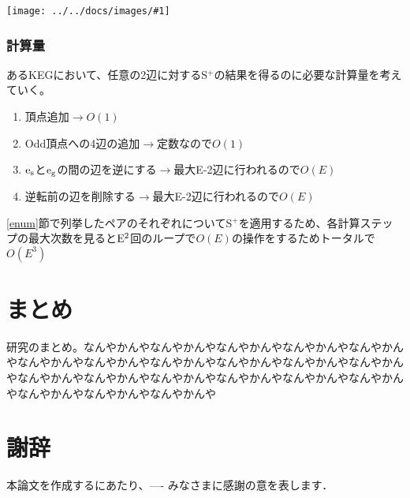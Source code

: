 \documentclass[11pt,a4j]{jarticle}
\newcommand{\splus}{S${}^\text{+}$}
\newcommand{\fl}[1]{$\rm{#1}$}
\newcommand{\image}[1]{\begin{center}\texttt{[image: ../../docs/images/\#1]}\end{center}}
\newcommand{\ra }{$\rightarrow$}
\begin{document}
\image{step2_2.jpg}

\subsubsection{計算量}
あるKEGにおいて、任意の2辺に対する\splus の結果を得るのに必要な計算量を考えていく。

\begin{enumerate}
    \item 頂点追加\ra  $O(1)$
    \item Odd頂点への4辺の追加\ra 定数なので$O(1)$
    \item \fl{e_s}と\fl{e_g}の間の辺を逆にする\ra 最大E-2辺に行われるので$O(E)$
    \item 逆転前の辺を削除する\ra 最大E-2辺に行われるので$O(E)$
\end{enumerate}

\ref{enum}節で列挙したペアのそれぞれについて\splus を適用するため、各計算ステップの最大次数を見ると\fl{E^2}回のループで$O(E)$の操作をするためトータルで$O(E^3)$

\section{まとめ}
研究のまとめ。なんやかんやなんやかんやなんやかんやなんやかんやなんやかんやなんやかんやなんやかんやなんやかんやなんやかんやなんやかんやなんやかんやなんやかんやなんやかんやなんやかんやなんやかんやなんやかんやなんやかんやなんやかんやなんやかんやなんやかんや

\section*{謝辞} %
本論文を作成するにあたり、---- みなさまに感謝の意を表します．


\end{document}
